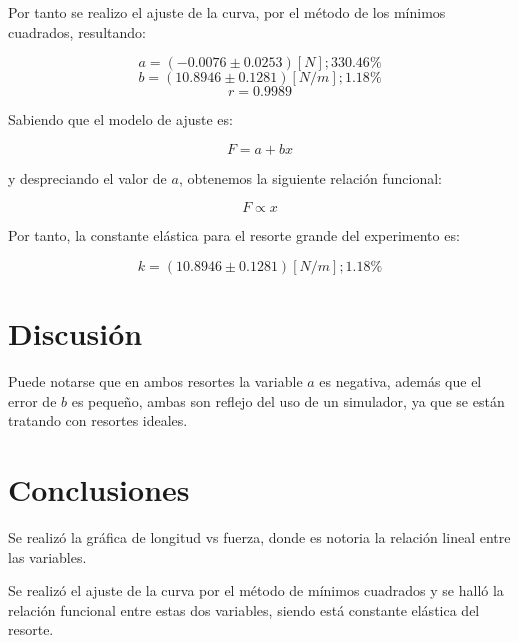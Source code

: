 \documentclass[letter,11pt]{article}
\begin{document}
Por tanto se realizo el ajuste de la curva, por el método de los mínimos
cuadrados, resultando:

\begin{equation*}
    a = (-0.0076 \pm 0.0253) [N]; 330.46 \%
\end{equation*}
\begin{equation*}
    b = (10.8946 \pm 0.1281) [N/m]; 1.18 \%
\end{equation*}
\begin{equation*}
    r = 0.9989
\end{equation*}

Sabiendo que el modelo de ajuste es:

\begin{equation*}
    F = a + b x
\end{equation*}
\vspace{0.25cm}

y despreciando el valor de $a$, obtenemos la siguiente relación funcional:

\begin{equation*}
    F \propto x
\end{equation*}
\vspace{0.25cm}

Por tanto, la constante elástica para el resorte grande del experimento es:

\begin{equation*}
    k = (10.8946 \pm 0.1281) [N/m]; 1.18 \%
\end{equation*}
\vspace{0.25cm}

\section{Discusión}

Puede notarse que en ambos resortes la variable $a$ es negativa, además que
el error de $b$ es pequeño, ambas son reflejo del uso de un simulador, ya que se
están tratando con resortes ideales.

\section{Conclusiones}

Se realizó la gráfica de longitud vs fuerza, donde es notoria la relación lineal
entre las variables.

Se realizó el ajuste de la curva por el método de mínimos cuadrados y se halló
la relación funcional entre estas dos variables, siendo está constante elástica
del resorte.
\end{document}
